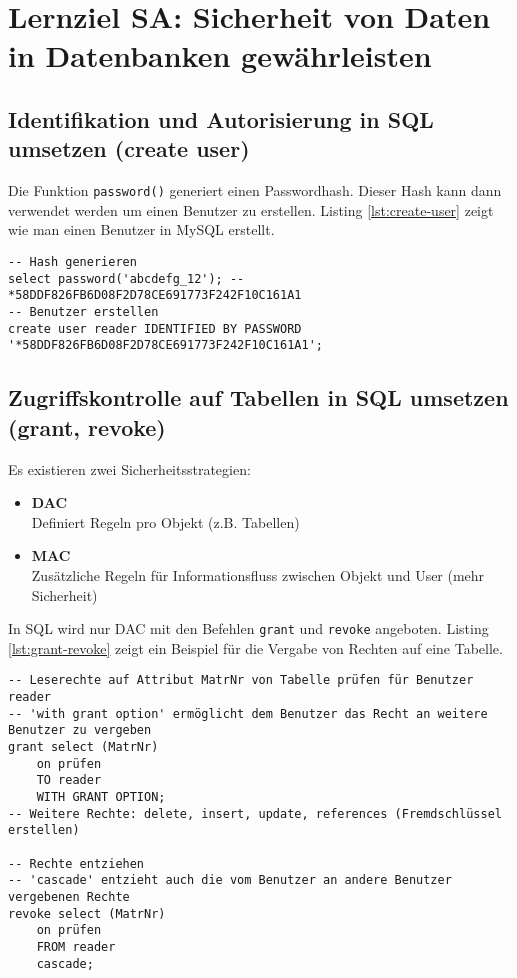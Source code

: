 \section{Lernziel SA: Sicherheit von Daten in Datenbanken gewährleisten}

\subsection{Identifikation und Autorisierung in SQL umsetzen (create user)}

Die Funktion \texttt{password()} generiert einen Passwordhash. Dieser Hash kann dann verwendet werden um einen Benutzer zu erstellen. Listing \ref{lst:create-user} zeigt wie man einen Benutzer in MySQL erstellt.

\begin{lstlisting}[caption={Benutzer erstellen},label=lst:create-user]
-- Hash generieren
select password('abcdefg_12'); -- *58DDF826FB6D08F2D78CE691773F242F10C161A1
-- Benutzer erstellen
create user reader IDENTIFIED BY PASSWORD '*58DDF826FB6D08F2D78CE691773F242F10C161A1';
\end{lstlisting}

\subsection{Zugriffskontrolle auf Tabellen in SQL umsetzen (grant, revoke)}

Es existieren zwei Sicherheitsstrategien:

\begin{itemize}
	\item \textbf{\ac{DAC}} \\
		  Definiert Regeln pro Objekt (z.B. Tabellen)
	\item \textbf{\ac{MAC}} \\
		  Zusätzliche Regeln für Informationsfluss zwischen Objekt und User (mehr Sicherheit)
\end{itemize}

In SQL wird nur \ac{DAC} mit den Befehlen \texttt{grant} und \texttt{revoke} angeboten. Listing \ref{lst:grant-revoke} zeigt ein Beispiel für die Vergabe von Rechten auf eine Tabelle.

\begin{lstlisting}[caption={Rechte auf Tabelle},label=lst:grant-revoke]
-- Leserechte auf Attribut MatrNr von Tabelle prüfen für Benutzer reader
-- 'with grant option' ermöglicht dem Benutzer das Recht an weitere Benutzer zu vergeben
grant select (MatrNr)
	on prüfen
	TO reader
	WITH GRANT OPTION;
-- Weitere Rechte: delete, insert, update, references (Fremdschlüssel erstellen)

-- Rechte entziehen
-- 'cascade' entzieht auch die vom Benutzer an andere Benutzer vergebenen Rechte
revoke select (MatrNr)
	on prüfen
	FROM reader
	cascade;
\end{lstlisting}

